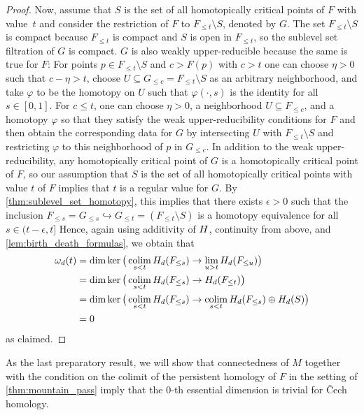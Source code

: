 \begin{proof}
	Now, assume that $S$ is the set of all homotopically critical points of $F$ with value~$t$ and consider the restriction of $F$ to $F_{\leq t} \setminus S$, denoted by $G$.
	The set $F_{\leq t} \setminus S$ is compact because $F_{\leq t}$ is compact and $S$ is open in $F_{\leq t}$, so the sublevel set filtration of $G$ is compact.
	$G$ is also weakly upper-reducible because the same is true for $F$: 
	For points $p \in F_{\leq t} \setminus S$ and $c > F(p)$ with $c > t$ one can choose $\eta > 0$ such that $c-\eta > t$, choose $U \subseteq G_{\leq c} = F_{\leq t} \setminus S$ as an arbitrary neighborhood, and take $\varphi$ to be the homotopy on $U$ such that $\varphi(\cdot,s)$ is the identity for all $s \in [0,1]$.
	For $c \leq t$, one can choose $\eta > 0$, a neighborhood $U \subseteq F_{\leq c}$, and a homotopy $\varphi$ so that they satisfy the weak upper-reducibility conditions for $F$ and then obtain the corresponding data for $G$ by intersecting $U$ with $F_{\leq t} \setminus S$ and restricting $\varphi$ to this neighborhood of $p$ in $G_{\leq c}$.
	In addition to the weak upper-reducibility, any homotopically critical point of $G$ is a homotopically critical point of $F$, so our assumption that $S$ is the set of all homotopically critical points with value $t$ of $F$ implies that $t$ is a regular value for $G$.
	By \cref{thm:sublevel_set_homotopy},  this implies that there exists $\epsilon > 0$ such that the inclusion $F_{\leq s} = G_{\leq s} \hookrightarrow G_{\leq t} = (F_{\leq t} \setminus S)$ is a homotopy equivalence for all $s \in (t - \epsilon, t]$
	Hence, again using additivity of $H$, continuity from above, and \cref{lem:birth_death_formulas}, we obtain that
	\begin{align*}
		\omega_d(t) &= \dim \ker \big( \operatorname*{colim}_{s < t} H_d(F_{\leq s}) \to \lim_{u > t} H_d(F_{\leq u}) \big) \\
				&= \dim \ker \big( \operatorname*{colim}_{s < t} H_d(F_{\leq s}) \to H_d(F_{\leq t}) \big) \\
				&= \dim \ker \big( \operatorname*{colim}_{s < t} H_d(F_{\leq s}) \to \operatorname*{colim}_{s < t} H_d(F_{\leq s}) \oplus H_d(S) \big) \\
				&= 0
	\end{align*}
	as claimed.
\end{proof}

As the last preparatory result, we will show that connectedness of $M$ together with the condition on the colimit of the persistent homology of $F$ in the setting of \cref{thm:mountain_pass} imply that the $0$-th essential dimension is trivial for \v{C}ech homology.


